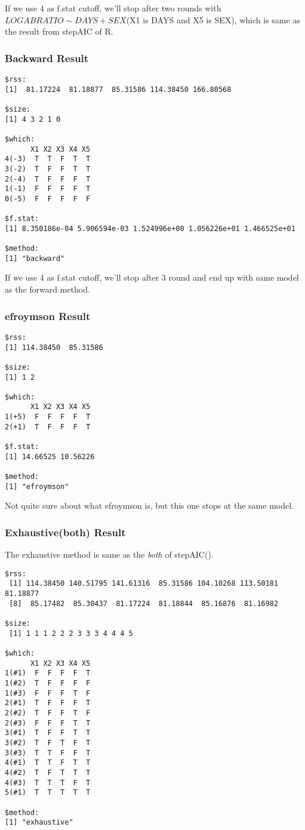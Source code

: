 \documentclass[a4paper,10pt]{article}
\begin{document}
If we use 4 as f.stat cutoff, we'll stop after two rounds with $LOGABRATIO \sim DAYS + SEX$(X1 is DAYS and X5 is SEX), which is same as the result from stepAIC of R.

\subsubsection{Backward Result}
\begin{verbatim}
$rss:
[1]  81.17224  81.18877  85.31586 114.38450 166.80568

$size:
[1] 4 3 2 1 0

$which:
      X1 X2 X3 X4 X5
4(-3)  T  T  F  T  T
3(-2)  T  F  F  T  T
2(-4)  T  F  F  F  T
1(-1)  F  F  F  F  T
0(-5)  F  F  F  F  F

$f.stat:
[1] 8.350186e-04 5.906594e-03 1.524996e+00 1.056226e+01 1.466525e+01

$method:
[1] "backward"
\end{verbatim}

If we use 4 as f.stat cutoff, we'll stop after 3 round and end up with same model as the forward method.

\subsubsection{efroymson Result}
\begin{verbatim}
$rss:
[1] 114.38450  85.31586

$size:
[1] 1 2

$which:
      X1 X2 X3 X4 X5
1(+5)  F  F  F  F  T
2(+1)  T  F  F  F  T

$f.stat:
[1] 14.66525 10.56226

$method:
[1] "efroymson"
\end{verbatim}

Not quite sure about what efroymson is, but this one stops at the same model.

\subsubsection{Exhaustive(both) Result}
The exhaustive method is same as the \emph{both} of stepAIC().
\begin{verbatim}
$rss:
 [1] 114.38450 140.51795 141.61316  85.31586 104.10268 113.50181  81.18877
 [8]  85.17482  85.30437  81.17224  81.18844  85.16876  81.16982

$size:
 [1] 1 1 1 2 2 2 3 3 3 4 4 4 5

$which:
      X1 X2 X3 X4 X5
1(#1)  F  F  F  F  T
1(#2)  T  F  F  F  F
1(#3)  F  F  F  T  F
2(#1)  T  F  F  F  T
2(#2)  T  F  F  T  F
2(#3)  F  F  F  T  T
3(#1)  T  F  F  T  T
3(#2)  T  F  T  F  T
3(#3)  T  T  F  F  T
4(#1)  T  T  F  T  T
4(#2)  T  F  T  T  T
4(#3)  T  T  T  F  T
5(#1)  T  T  T  T  T

$method:
[1] "exhaustive"
\end{verbatim}
\end{document}
